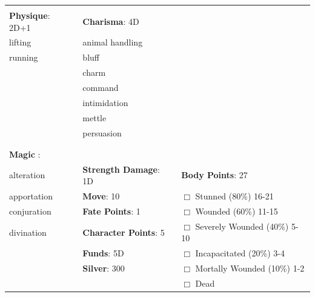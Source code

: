 \documentclass[10pt]{article}
\begin{document}
\begin{table}
\begin{tabular}{m{156pt} m{156pt} m{156pt}}
 \hrulefill &  \hrulefill &  \hrulefill \\


\textbf{Physique}: 2D+1 \hrulefill & \textbf{Charisma}: 4D \hrulefill     &  \hrulefill \\

lifting              \hrulefill & animal handling      \hrulefill &  \hrulefill \\

running              \hrulefill & bluff                \hrulefill &  \hrulefill \\

 \hrulefill & charm                \hrulefill &  \hrulefill \\

 \hrulefill & command              \hrulefill &  \hrulefill \\

 \hrulefill & intimidation         \hrulefill &  \hrulefill \\

 \hrulefill & mettle               \hrulefill &  \hrulefill \\

 \hrulefill & persuasion           \hrulefill &  \hrulefill \\

 \hrulefill &  \hrulefill &  \hrulefill \\

                                  &                                 &                             \\
\textbf{Magic }:  \hrulefill  &                                 &                             \\
alteration           \hrulefill & \textbf{Strength Damage}: 1D \hrulefill                             & \textbf{Body Points}: 27 \hrulefill \\
apportation          \hrulefill                        & \textbf{Move}:             10             \hrulefill    & $\Box$ Stunned \footnotesize{(80\%)} \hfill 16-21 \\
conjuration          \hrulefill                        & \textbf{Fate Points}:      1      \hrulefill    & $\Box$ Wounded \footnotesize{(60\%)} \hfill 11-15 \\
divination           \hrulefill                        & \textbf{Character Points}: 5 \hrulefill    & $\Box$ Severely Wounded \footnotesize{(40\%)} \hfill 5-10 \\
 \hrulefill                        & \textbf{Funds}:            5D            \hrulefill    & $\Box$ Incapacitated \footnotesize{(20\%)} \hfill 3-4 \\
 \hrulefill                        & \textbf{Silver}:           300           \hrulefill    & $\Box$ Mortally Wounded \footnotesize{(10\%)} \hfill 1-2 \\
 \hrulefill                        &  \hrulefill                                                       & $\Box$ Dead   \\
\end{tabular}
\end{table}
\end{document}
